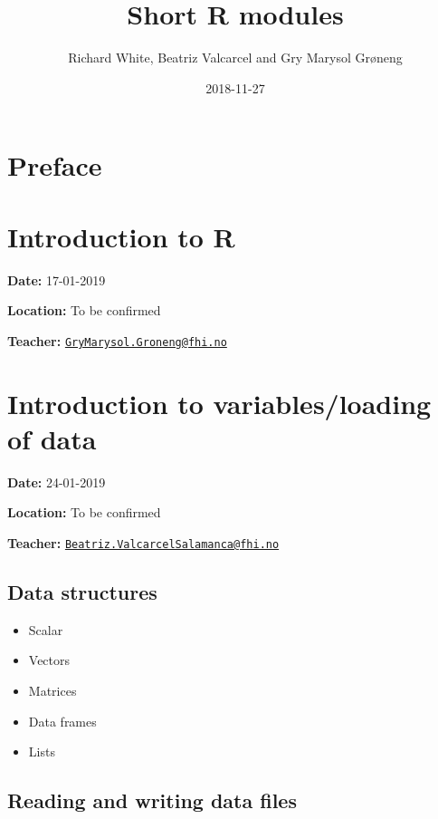 \documentclass[12pt,]{article}
\title{Short R modules}
\author{Richard White, Beatriz Valcarcel and Gry Marysol Grøneng}
\date{2018-11-27}
\providecommand{\tightlist}{%
  \setlength{\itemsep}{0pt}\setlength{\parskip}{0pt}}
\begin{document}
\maketitle

{
\hypersetup{linkcolor=black}
\setcounter{tocdepth}{2}
\tableofcontents
}
\listoftables
\listoffigures
\section*{Preface}\label{preface}

\section{Introduction to R}\label{introduction-to-r}

\textbf{Date:} 17-01-2019

\textbf{Location:} To be confirmed

\textbf{Teacher:}
\href{mailto:GryMarysol.Groneng@fhi.no}{\nolinkurl{GryMarysol.Groneng@fhi.no}}

\section{Introduction to variables/loading of
data}\label{introduction-to-variablesloading-of-data}

\textbf{Date:} 24-01-2019

\textbf{Location:} To be confirmed

\textbf{Teacher:}
\href{mailto:Beatriz.ValcarcelSalamanca@fhi.no}{\nolinkurl{Beatriz.ValcarcelSalamanca@fhi.no}}

\subsection{Data structures}\label{data-structures}

\begin{itemize}
\tightlist
\item
  Scalar
\item
  Vectors
\item
  Matrices
\item
  Data frames
\item
  Lists
\end{itemize}

\subsection{Reading and writing data
files}\label{reading-and-writing-data-files}
\end{document}
